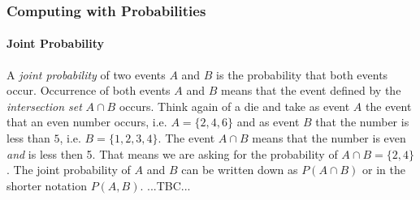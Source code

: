 














\subsubsection{Computing with Probabilities}


\paragraph{Joint Probability}
A \emph{joint probability} of two events $A$ and $B$ is the probability that both events occur. Occurrence of both events $A$ and $B$ means that the event defined by the \emph{intersection set} $A \cap B$ occurs. Think again of a die and take as event $A$ the event that an even number occurs, i.e. $A = \{2,4,6\}$ and as event $B$ that the number is less than $5$, i.e. $B = \{1,2,3,4\}$. The event $A \cap B$ means that the number is even \emph{and} is less then 5. That means we are asking for the probability of $A \cap B = \{2,4\}$. The joint probability of $A$ and $B$ can be written down as $P(A \cap B)$ or in the shorter notation $P(A,B)$. ...TBC...

